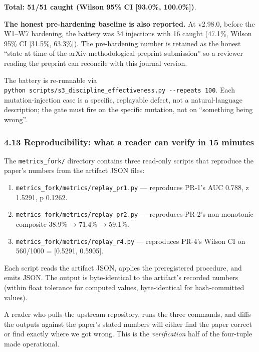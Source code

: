 \documentclass[
]{article}
\providecommand{\tightlist}{%
  \setlength{\itemsep}{0pt}\setlength{\parskip}{0pt}}
\begin{document}
\textbf{Total: 51/51 caught (Wilson 95\% CI {[}93.0\%, 100.0\%{]})}.

\textbf{The honest pre-hardening baseline is also reported.} At v2.98.0,
before the W1--W7 hardening, the battery was 34 injections with 16
caught (47.1\%, Wilson 95\% CI {[}31.5\%, 63.3\%{]}). The pre-hardening
number is retained as the honest ``state at time of the arXiv
methodological preprint submission'' so a reviewer reading the preprint
can reconcile with this journal version.

The battery is re-runnable via
\texttt{python\ scripts/s3\_discipline\_effectiveness.py\ -\/-repeats\ 100}.
Each mutation-injection case is a specific, replayable defect, not a
natural-language description; the gate must fire on the specific
mutation, not on ``something being wrong''.

\subsubsection{4.13 Reproducibility: what a reader can verify in 15
minutes}\label{reproducibility-what-a-reader-can-verify-in-15-minutes}

The \texttt{metrics\_fork/} directory contains three read-only scripts
that reproduce the paper's numbers from the artifact JSON files:

\begin{enumerate}
\def\labelenumi{\arabic{enumi}.}
\tightlist
\item
  \texttt{metrics\_fork/metrics/replay\_pr1.py} --- reproduces PR-1's
  AUC 0.788, z 1.5291, p 0.1262.
\item
  \texttt{metrics\_fork/metrics/replay\_pr2.py} --- reproduces PR-2's
  non-monotonic composite 38.9\% → 71.4\% → 59.1\%.
\item
  \texttt{metrics\_fork/metrics/replay\_r4.py} --- reproduces PR-4's
  Wilson CI on 560/1000 = {[}0.5291, 0.5905{]}.
\end{enumerate}

Each script reads the artifact JSON, applies the preregistered
procedure, and emits JSON. The output is byte-identical to the
artifact's recorded numbers (within float tolerance for computed values,
byte-identical for hash-committed values).

A reader who pulls the upstream repository, runs the three commands, and
diffs the outputs against the paper's stated numbers will either find
the paper correct or find exactly where we got wrong. This is the
\emph{verification} half of the four-tuple made operational.
\end{document}
